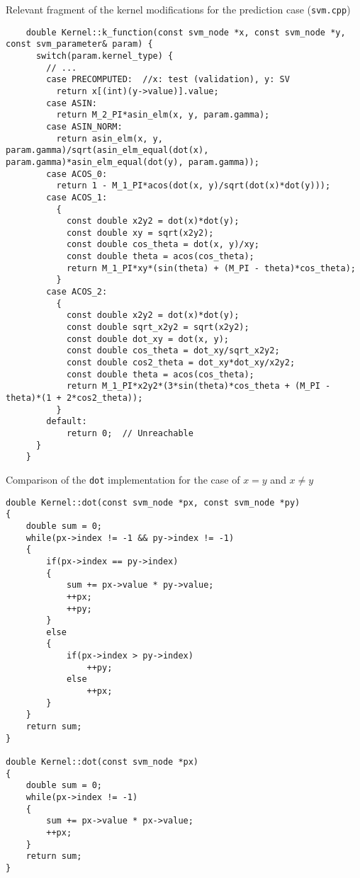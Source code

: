 \begin{listing}
    \caption{Relevant fragment of the kernel modifications for the prediction case (\texttt{svm.cpp})}
    \label{lst:svm_cpp_k_function}
    \begin{verbatim}
    double Kernel::k_function(const svm_node *x, const svm_node *y, const svm_parameter& param) {
      switch(param.kernel_type) {
        // ...
        case PRECOMPUTED:  //x: test (validation), y: SV
          return x[(int)(y->value)].value;
        case ASIN:
          return M_2_PI*asin_elm(x, y, param.gamma);
        case ASIN_NORM:
          return asin_elm(x, y, param.gamma)/sqrt(asin_elm_equal(dot(x), param.gamma)*asin_elm_equal(dot(y), param.gamma));
        case ACOS_0:
          return 1 - M_1_PI*acos(dot(x, y)/sqrt(dot(x)*dot(y)));
        case ACOS_1:
          {
            const double x2y2 = dot(x)*dot(y);
            const double xy = sqrt(x2y2);
            const double cos_theta = dot(x, y)/xy;
            const double theta = acos(cos_theta);
            return M_1_PI*xy*(sin(theta) + (M_PI - theta)*cos_theta);
          }
        case ACOS_2:
          {
            const double x2y2 = dot(x)*dot(y);
            const double sqrt_x2y2 = sqrt(x2y2);
            const double dot_xy = dot(x, y);
            const double cos_theta = dot_xy/sqrt_x2y2;
            const double cos2_theta = dot_xy*dot_xy/x2y2;
            const double theta = acos(cos_theta);
            return M_1_PI*x2y2*(3*sin(theta)*cos_theta + (M_PI - theta)*(1 + 2*cos2_theta));
          }
        default:
            return 0;  // Unreachable
      }
    }
    \end{verbatim}
\end{listing}

\begin{listing}
    \caption{Comparison of the \texttt{dot} implementation for the case of $x = y$ and $x \neq y$}
    \label{lst:dot}
\begin{verbatim}
double Kernel::dot(const svm_node *px, const svm_node *py)
{
	double sum = 0;
	while(px->index != -1 && py->index != -1)
	{
		if(px->index == py->index)
		{
			sum += px->value * py->value;
			++px;
			++py;
		}
		else
		{
			if(px->index > py->index)
				++py;
			else
				++px;
		}
	}
	return sum;
}

double Kernel::dot(const svm_node *px)
{
	double sum = 0;
	while(px->index != -1)
	{
		sum += px->value * px->value;
		++px;
	}
	return sum;
}
\end{verbatim}
\end{listing}
